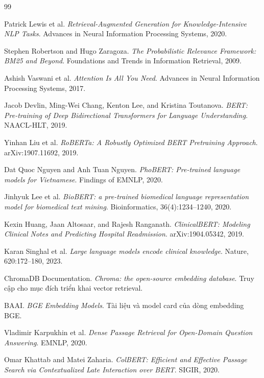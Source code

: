 \renewcommand{\bibname}{TÀI LIỆU THAM KHẢO}
\begin{thebibliography}{99}

Patrick Lewis et al. \textit{Retrieval-Augmented Generation for Knowledge-Intensive NLP Tasks}. Advances in Neural Information Processing Systems, 2020.

Stephen Robertson and Hugo Zaragoza. \textit{The Probabilistic Relevance Framework: BM25 and Beyond}. Foundations and Trends in Information Retrieval, 2009.

Ashish Vaswani et al. \textit{Attention Is All You Need}. Advances in Neural Information Processing Systems, 2017.

Jacob Devlin, Ming-Wei Chang, Kenton Lee, and Kristina Toutanova. \textit{BERT: Pre-training of Deep Bidirectional Transformers for Language Understanding}. NAACL-HLT, 2019.

Yinhan Liu et al. \textit{RoBERTa: A Robustly Optimized BERT Pretraining Approach}. arXiv:1907.11692, 2019.

Dat Quoc Nguyen and Anh Tuan Nguyen. \textit{PhoBERT: Pre-trained language models for Vietnamese}. Findings of EMNLP, 2020.

Jinhyuk Lee et al. \textit{BioBERT: a pre-trained biomedical language representation model for biomedical text mining}. Bioinformatics, 36(4):1234--1240, 2020.

Kexin Huang, Jaan Altosaar, and Rajesh Ranganath. \textit{ClinicalBERT: Modeling Clinical Notes and Predicting Hospital Readmission}. arXiv:1904.05342, 2019.

Karan Singhal et al. \textit{Large language models encode clinical knowledge}. Nature, 620:172--180, 2023.

ChromaDB Documentation. \textit{Chroma: the open-source embedding database}. Truy cập cho mục đích triển khai vector retrieval.

BAAI. \textit{BGE Embedding Models}. Tài liệu và model card của dòng embedding BGE.

Vladimir Karpukhin et al. \textit{Dense Passage Retrieval for Open-Domain Question Answering}. EMNLP, 2020.

Omar Khattab and Matei Zaharia. \textit{ColBERT: Efficient and Effective Passage Search via Contextualized Late Interaction over BERT}. SIGIR, 2020.


\end{thebibliography}
